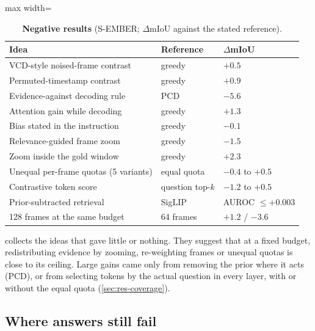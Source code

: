 \begin{table}[t]
  \centering
  \small
  \setlength{\tabcolsep}{3pt}
  \caption{\textbf{Negative results} (S-EMBER; $\Delta$mIoU against the stated reference).}
  \label{tab:negative}
  \begin{adjustbox}{max width=\linewidth}\begin{tabular}{@{}lll@{}}
    \toprule
    Idea & Reference & $\Delta$mIoU \\
    \midrule
    VCD-style noised-frame contrast   & greedy          & $+0.5$ \\
    Permuted-timestamp contrast       & greedy          & $+0.9$ \\
    Evidence-against decoding rule    & PCD             & $-5.6$ \\
    Attention gain while decoding     & greedy          & $+1.3$ \\
    Bias stated in the instruction    & greedy          & $-0.1$ \\
    Relevance-guided frame zoom       & greedy          & $-1.5$ \\
    Zoom inside the gold window       & greedy          & $+2.3$ \\
    Unequal per-frame quotas (5 variants) & equal quota & $-0.4$ to $+0.5$ \\
    Contrastive token score           & question top-$k$ & $-1.2$ to $+0.5$ \\
    Prior-subtracted retrieval        & SigLIP          & AUROC $\leq +0.003$ \\
    128 frames at the same budget     & 64 frames       & $+1.2$ / $-3.6$ \\
    \bottomrule
  \end{tabular}\end{adjustbox}
\end{table}

 collects the ideas that gave little or nothing. They suggest that at a fixed budget,
redistributing evidence by zooming, re-weighting frames or unequal quotas is close to its ceiling. Large gains came
only from removing the prior where it acts (PCD), or from selecting tokens by the actual question in every
layer, with or without the equal quota (\cref{sec:res-coverage}).

\subsection{Where answers still fail}
\label{sec:errors}


